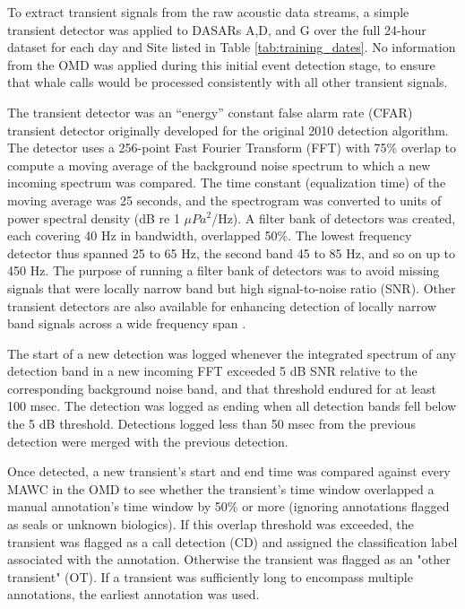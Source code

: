 \documentclass[preprint,NumberedRefs]{JASAnew}
\begin{document}
To extract transient signals from the raw acoustic data streams, a simple transient detector was applied to DASARs A,D, and G over the full 24-hour dataset for each day and Site listed in Table \ref{tab:training_dates}.  No information from the OMD was applied during this initial event detection stage, to ensure that whale calls would be processed consistently with all other transient signals.

The transient detector was an “energy” constant false alarm rate (CFAR) transient detector originally developed for the original 2010 detection algorithm\cite{thode2012automated}.  The detector uses a 256-point Fast Fourier Transform (FFT) with 75\% overlap to compute a moving average of the background noise spectrum to which a new incoming spectrum was compared.  The time constant (equalization time) of the moving average was 25 seconds, and the spectrogram was converted to units of power spectral density (dB re 1 $\mu Pa^2$/Hz).   A filter bank of detectors was created, each covering 40 Hz in bandwidth, overlapped 50\%.  The lowest frequency detector thus spanned 25 to 65 Hz, the second band 45 to 85 Hz, and so on up to 450 Hz. The purpose of running a filter bank of detectors was to avoid missing signals that were locally narrow band but high signal-to-noise ratio (SNR).  Other transient detectors are also available for enhancing detection of locally narrow band signals across a wide frequency span \cite{wang2001all, helble2012generalized}.

The start of a new detection was logged whenever the integrated spectrum of any detection band in a new incoming FFT exceeded 5 dB SNR relative to the corresponding background noise band, and that threshold endured for at least 100 msec.  The detection was logged as ending when all detection bands fell below the 5 dB threshold.  Detections logged less than 50 msec from the previous detection were merged with the previous detection.  

Once detected, a new transient's start and end time was compared against every MAWC in the OMD to see whether the transient's time window overlapped a manual annotation's time window by 50\% or more (ignoring annotations flagged as seals or unknown biologics).  If this overlap threshold was exceeded, the transient was flagged as a call detection (CD) and assigned the classification label associated with the annotation.  Otherwise the transient was flagged as an "other transient" (OT).  If a transient was sufficiently long to encompass multiple annotations, the earliest annotation was used.
\end{document}
